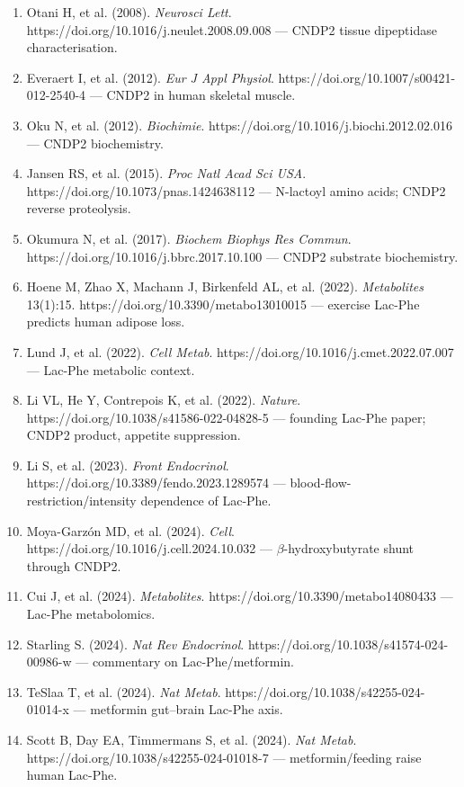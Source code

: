 \documentclass[11pt]{article}
\begin{document}
\begin{enumerate}
\item Otani H, et al. (2008). \textit{Neurosci Lett}. https://doi.org/10.1016/j.neulet.2008.09.008 --- CNDP2 tissue dipeptidase characterisation.
\item Everaert I, et al. (2012). \textit{Eur J Appl Physiol}. https://doi.org/10.1007/s00421-012-2540-4 --- CNDP2 in human skeletal muscle.
\item Oku N, et al. (2012). \textit{Biochimie}. https://doi.org/10.1016/j.biochi.2012.02.016 --- CNDP2 biochemistry.
\item Jansen RS, et al. (2015). \textit{Proc Natl Acad Sci USA}. https://doi.org/10.1073/pnas.1424638112 --- N-lactoyl amino acids; CNDP2 reverse proteolysis.
\item Okumura N, et al. (2017). \textit{Biochem Biophys Res Commun}. https://doi.org/10.1016/j.bbrc.2017.10.100 --- CNDP2 substrate biochemistry.
\item Hoene M, Zhao X, Machann J, Birkenfeld AL, et al. (2022). \textit{Metabolites} 13(1):15. https://doi.org/10.3390/metabo13010015 --- exercise Lac-Phe predicts human adipose loss.
\item Lund J, et al. (2022). \textit{Cell Metab}. https://doi.org/10.1016/j.cmet.2022.07.007 --- Lac-Phe metabolic context.
\item Li VL, He Y, Contrepois K, et al. (2022). \textit{Nature}. https://doi.org/10.1038/s41586-022-04828-5 --- founding Lac-Phe paper; CNDP2 product, appetite suppression.
\item Li S, et al. (2023). \textit{Front Endocrinol}. https://doi.org/10.3389/fendo.2023.1289574 --- blood-flow-restriction/intensity dependence of Lac-Phe.
\item Moya-Garz\'on MD, et al. (2024). \textit{Cell}. https://doi.org/10.1016/j.cell.2024.10.032 --- $\beta$-hydroxybutyrate shunt through CNDP2.
\item Cui J, et al. (2024). \textit{Metabolites}. https://doi.org/10.3390/metabo14080433 --- Lac-Phe metabolomics.
\item Starling S. (2024). \textit{Nat Rev Endocrinol}. https://doi.org/10.1038/s41574-024-00986-w --- commentary on Lac-Phe/metformin.
\item TeSlaa T, et al. (2024). \textit{Nat Metab}. https://doi.org/10.1038/s42255-024-01014-x --- metformin gut--brain Lac-Phe axis.
\item Scott B, Day EA, Timmermans S, et al. (2024). \textit{Nat Metab}. https://doi.org/10.1038/s42255-024-01018-7 --- metformin/feeding raise human Lac-Phe.

\end{enumerate}
\end{document}
